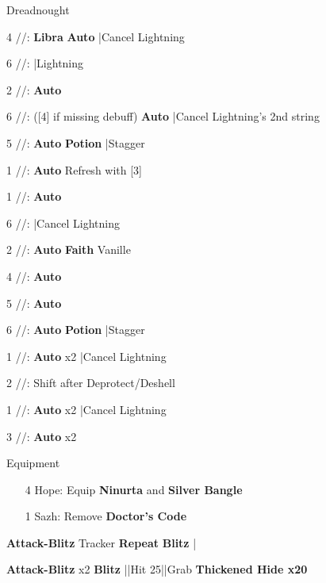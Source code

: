 \begin{fight}{Dreadnought}
	\item [4] \rav/\rav/\sab: \textbf{Libra} \to \textbf{Auto} |Cancel Lightning
	\item [6] \rav/\rav/\rav: |Lightning
	\item [2] \syn/\com/\sab: \textbf{Auto}
	\item [6] \rav/\rav/\rav: ([4] if missing debuff) \textbf{Auto}
		|Cancel Lightning's 2nd string
	\item [5] \rav/\rav/\rav: \textbf{Auto} \to \textbf{\textbf{Potion}}
		|Stagger
	\item [1] \rav/\com/\rav: \textbf{Auto} \to Refresh with [3]
	\item \skip
	\item [1] \rav/\com/\rav: \textbf{Auto}
	\item [6] \rav/\rav/\rav: |Cancel Lightning
	\item [2] \syn/\com/\sab: \textbf{Auto} \to \textbf{Faith} Vanille
	\item [4] \rav/\rav/\sab: \textbf{Auto}
	\item [5] \rav/\rav/\rav: \textbf{Auto}
	\item [6] \rav/\rav/\rav: \textbf{Auto} \to \textbf{\textbf{Potion}}
		|Stagger
	\item [1] \rav/\com/\rav: \textbf{Auto} x2 |Cancel Lightning
	\item [2] \syn/\com/\sab: Shift after Deprotect/Deshell
	\item [1] \rav/\com/\rav: \textbf{Auto} x2 |Cancel Lightning
	\item [3] \rav/\com/\rav: \textbf{Auto} x2
	\item \skip
\end{fight}
\begin{menu}
	\item Equipment
	\begin{itemize}
		\item [4] Hope: Equip \textbf{Ninurta} and \textbf{Silver Bangle}
		\item [1] Sazh: Remove \textbf{Doctor's Code}
	\end{itemize}
\end{menu}
\begin{mainlist}
	\item {}
	\item {}\textbf{Attack-Blitz} Tracker \to
		[2] \textbf{Repeat} \to \textbf{Blitz} |
	\item \skip
	\item {} \textbf{Attack-Blitz} x2 \to
		\textbf{Blitz} |\skip|Hit 25|\skip|Grab \textbf{Thickened Hide x20}
\end{mainlist}
